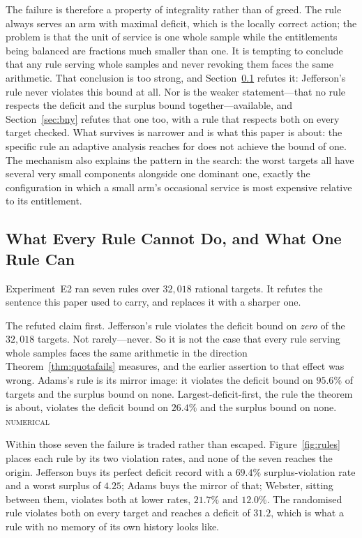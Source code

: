 \documentclass[conference]{IEEEtran}
\theoremstyle{definition}
\newcommand{\NUM}{\textsc{numerical}}
\begin{document}
The failure is therefore a property of integrality rather than of greed. The rule always serves
an arm with maximal deficit, which is the locally correct action; the problem is that the unit
of service is one whole sample while the entitlements being balanced are fractions much smaller
than one. It is tempting to conclude that any rule serving whole samples and never revoking
them faces the same arithmetic. That conclusion is too strong, and
Section~\ref{sec:e2results} refutes it: Jefferson's rule never violates this bound at all.
Nor is the weaker statement---that no rule respects the deficit and the surplus bound
together---available, and Section~\ref{sec:bny} refutes that one too, with a rule that
respects both on every target checked. What survives is narrower and is what this paper is
about: the specific rule an adaptive analysis reaches for does not achieve the bound of one.
The mechanism also explains
the pattern in the search: the worst targets all have several very small components alongside
one dominant one, exactly the configuration in which a small arm's occasional service is most
expensive relative to its entitlement.

\subsection{What Every Rule Cannot Do, and What One Rule Can}
\label{sec:e2results}

Experiment~E2 ran seven rules over $32{,}018$ rational targets. It refutes the sentence this
paper used to carry, and replaces it with a sharper one.

The refuted claim first. Jefferson's rule violates the deficit bound on \emph{zero} of the
$32{,}018$ targets. Not rarely---never. So it is not the case that every rule serving whole
samples faces the same arithmetic in the direction Theorem~\ref{thm:quotafails} measures, and
the earlier assertion to that effect was wrong. Adams's rule is its mirror image: it violates
the deficit bound on $95.6\%$ of targets and the surplus bound on none. Largest-deficit-first,
the rule the theorem is about, violates the deficit bound on $26.4\%$ and the surplus bound on
none. \NUM{}

Within those seven the failure is traded rather than escaped. Figure~\ref{fig:rules} places
each rule by its two violation rates, and none of the seven reaches the origin. Jefferson buys
its perfect deficit record with a $69.4\%$ surplus-violation rate and a worst surplus of
$4.25$; Adams buys the mirror of that; Webster, sitting between them, violates both at lower
rates, $21.7\%$ and $12.0\%$. The randomised rule violates both on every target and reaches a
deficit of $31.2$, which is what a rule with no memory of its own history looks like.
\end{document}
